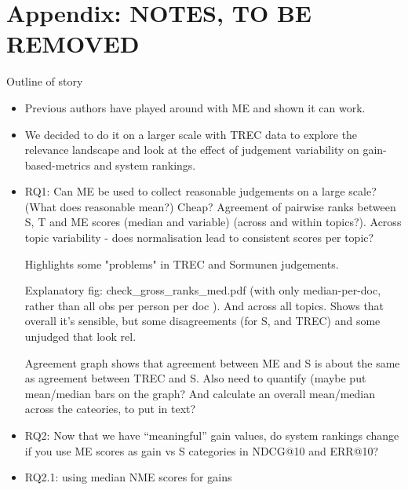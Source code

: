 \section{Appendix: NOTES,  TO BE REMOVED}


Outline of story
\begin{itemize}
\item Previous authors have played around with ME and shown it can work.

\item We decided to do it on a larger scale with TREC data to explore the relevance
landscape and look at the effect of judgement variability on gain-based-metrics and system rankings.

\item RQ1: Can ME be used to collect reasonable judgements on a large scale?
        (What does reasonable mean?) Cheap?
        Agreement of pairwise ranks between S, T and ME scores (median and variable) (across and within topics?).
        Across topic variability - does normalisation lead to consistent scores per topic?

        Highlights some "problems" in TREC and Sormunen judgements.

        Explanatory fig: check\_gross\_ranks\_med.pdf (with only
        median-per-doc, rather than all obs per person per doc
        ).
        And across all topics.
        Shows that overall it's sensible, but some disagreements (for
        S, and TREC) and some unjudged that look rel.

        Agreement graph shows that agreement between ME and S
        is about the same as agreement between TREC and S. Also need to
        quantify (maybe put mean/median bars on the graph? And calculate
        an overall mean/median across the cateories, to put in text?


\item RQ2: Now that we have ``meaningful'' gain values, 
            do system rankings change if you use ME scores as gain vs S categories 
            in NDCG@10 and ERR@10?

\item RQ2.1: using median NME scores for gains


\end{itemize}

